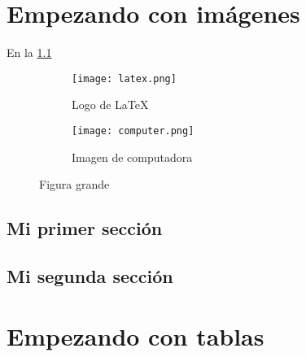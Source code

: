 \documentclass[12pt]{report}
\begin{document}
	\maketitle
	\tableofcontents
	\listoffigures
	\listoftables
	
	\chapter{Empezando con imágenes}
		
		En la \cref{fig:latex-logo} \lipsum[1][1-11]
	
		\begin{figure}[h]
			\centering
			\begin{subfigure}{0.4\textwidth}
				\centering
				\texttt{[image: latex.png]}
				\caption{Logo de \LaTeX}
				\label{fig:latex-logo}
			\end{subfigure}
			\hfill
			\begin{subfigure}{0.4\textwidth}
				\centering
				\texttt{[image: computer.png]}
				\caption{Imagen de computadora}
				\label{fig:computer-image}
			\end{subfigure}
			\caption{Figura grande}
			\label{fig:grande}
		\end{figure}
		
		\section{Mi primer sección}
			\lipsum[1-2]
			\lipsum[1][1-3] \cite{nadeeshani_nicotinamide_2022}
		
		\section{Mi segunda sección}
			\lipsum[3-5]
			
	\chapter{Empezando con tablas}
		
\end{document}
